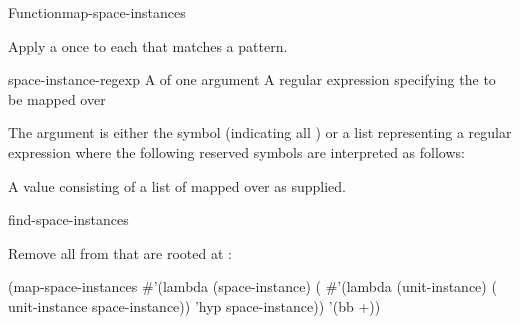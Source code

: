 \documentclass[10pt,twoside,english,pdftex]{article}
\begin{document}
\begin{functiondoc}{Function}{map-space-instances}%
  {}

\fnsyntax

\fnpurpose Apply a  once to each
 that matches a  pattern.

\fnpackage {}

\fnmodule {}

\fnargs
\begin{args}{space-instance-regexp}
\arg[function] A  of one argument
 A  regular expression
specifying the  to be mapped over
\end{args}

\fndescription 
The  argument is either the symbol
 (indicating all ) or a list
representing a regular expression where the following reserved symbols
are interpreted as follows:
\spaceinstanceregexp

A  value consisting of a list of
 mapped over as supplied.

\begin{alsos}{find-space-instances}
\end{alsos}

\fnexample 
{}%
%
Remove all   from
 that are rooted at :
\begin{example}
  (map-space-instances 
    #'(lambda (space-instance)
        (
          #'(lambda (unit-instance)
              ( unit-instance space-instance))
          'hyp
          space-instance))
    '(bb +))
\end{example}

\end{functiondoc}

\end{document}
